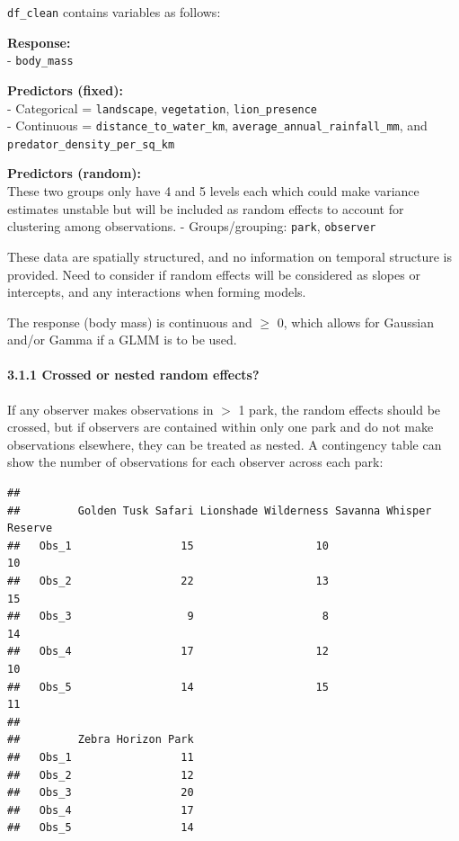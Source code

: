 \documentclass[
]{article}
\newenvironment{Shaded}{\begin{snugshade}}{\end{snugshade}}
\newcommand{\FunctionTok}[1]{\textcolor[rgb]{0.13,0.29,0.53}{\textbf{#1}}}
\newcommand{\NormalTok}[1]{#1}
\newcommand{\SpecialCharTok}[1]{\textcolor[rgb]{0.81,0.36,0.00}{\textbf{#1}}}
\begin{document}
\texttt{df\_clean} contains variables as follows:

\textbf{Response:}\\
- \texttt{body\_mass}

\textbf{Predictors (fixed):}\\
- Categorical = \texttt{landscape}, \texttt{vegetation},
\texttt{lion\_presence}\\
- Continuous = \texttt{distance\_to\_water\_km},
\texttt{average\_annual\_rainfall\_mm}, and
\texttt{predator\_density\_per\_sq\_km}

\textbf{Predictors (random):}\\
These two groups only have 4 and 5 levels each which could make variance
estimates unstable but will be included as random effects to account for
clustering among observations. - Groups/grouping: \texttt{park},
\texttt{observer}

These data are spatially structured, and no information on temporal
structure is provided. Need to consider if random effects will be
considered as slopes or intercepts, and any interactions when forming
models.

The response (body mass) is continuous and \(\geq\) 0, which allows for
Gaussian and/or Gamma if a GLMM is to be used.

\paragraph{3.1.1 Crossed or nested random
effects?}\label{crossed-or-nested-random-effects}

If any observer makes observations in \(\gt\) 1 park, the random effects
should be crossed, but if observers are contained within only one park
and do not make observations elsewhere, they can be treated as nested. A
contingency table can show the number of observations for each observer
across each park:

\begin{Shaded}
\end{Shaded}

\begin{verbatim}
##        
##         Golden Tusk Safari Lionshade Wilderness Savanna Whisper Reserve
##   Obs_1                 15                   10                      10
##   Obs_2                 22                   13                      15
##   Obs_3                  9                    8                      14
##   Obs_4                 17                   12                      10
##   Obs_5                 14                   15                      11
##        
##         Zebra Horizon Park
##   Obs_1                 11
##   Obs_2                 12
##   Obs_3                 20
##   Obs_4                 17
##   Obs_5                 14
\end{verbatim}
\end{document}
